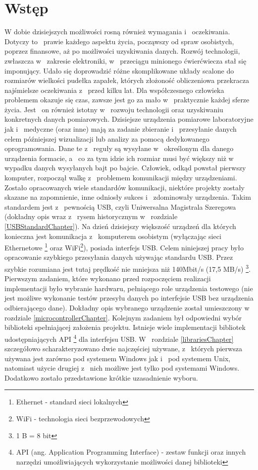 \documentclass{BscUS}
\begin{document}
\chapter{Wstęp}
\label{beginChapter}
\pagestyle{fancy}
W dobie dzisiejszych możliwości rosną również wymagania i~ oczekiwania. Dotyczy to~ prawie każdego aspektu życia, począwszy od spraw osobistych, poprzez finansowe, aż po możliwości uzyskiwania danych. Rozwój technologii, zwłaszcza w~ zakresie elektroniki, w~ przeciągu minionego ćwierćwiecza stał się imponujący. Udało się doprowadzić różne skomplikowane układy scalone do~ rozmiarów wielkości pudełka zapałek, których złożoność obliczeniowa przekracza najśmielsze oczekiwania z~ przed kilku lat. Dla współczesnego człowieka problemem okazuje się czas, zawsze jest go za mało w~ praktycznie każdej sferze życia. Jest~ on również istotny w~ rozwoju technologii oraz uzyskiwaniu konkretnych danych pomiarowych.
\newline
\indent Dzisiejsze urządzenia pomiarowe laboratoryjne jak i~ medyczne (oraz inne) mają za zadanie zbieranie i~ przesyłanie danych celem późniejszej wizualizacji lub analizy za pomocą dedykowanego oprogramowania. Dane te z~ reguły są wysyłane w~ określonym dla danego urządzenia formacie, a~ co za tym idzie ich rozmiar musi być większy niż w~ wypadku danych wysyłanych bajt po bajcie.
\newline
\indent Człowiek, odkąd powstał pierwszy komputer, rozpoczął walkę z~ problemem komunikacji między urządzeniami. Zostało opracowanych wiele standardów komunikacji, niektóre projekty zostały skazane na zapomnienie, inne odniosły sukces i~ zdominowały urządzenia. Takim standardem jest z~ pewnością USB, czyli Uniwersalna Magistrala Szeregowa (dokładny opis wraz z~ rysem historycznym w~ rozdziale \ref{USBStandardChapter}). Na dzień dzisiejszy większość urządzeń dla których konieczna jest komunikacja z~ komputerem osobistym (wyłączając sieci Ethernetowe \footnote{Ethernet - standard sieci lokalnych} oraz WiFi\footnote{WiFi - technologia sieci bezprzewodowych}), posiada interfejs USB.
\newline
\indent Celem niniejszej pracy było opracowanie szybkiego przesyłania danych używając standardu USB. Przez szybkie rozumiana jest tutaj prędkość nie mniejsza niż 140Mbit/s (17,5 MB/s) \footnote{1 B = 8 bit}.
\newline
\indent Pierwszym zadaniem, które wykonano przed rozpoczęciem realizacji implementacji było wybranie hardwaru, pełniącego role urządzenia testowego (nie jest możliwe wykonanie testów przesyłu danych po interfejsie USB bez urządzenia odbierającego dane). Dokładny opis wybranego urządzenie został umieszczony w~ rozdziale \ref{microcontrollerChapter}. Kolejnym zadaniem był odpowiedni wybór biblioteki spełniającej założenia projektu. Istnieje wiele implementacji bibliotek udostępniających API \footnote{API (ang. Application Programming Interface) - zestaw funkcji oraz innych narzędzi umożliwiających wykorzystanie możliwości danej biblioteki} dla interfejsu USB. W~ rozdziale \ref{librariesChapter} szczegółowo scharakteryzowano dwie najczęściej używane, z~ których pierwsza używana jest zarówno pod systemem Windows jak i~ pod systemem Unix, natomiast użycie drugiej z~ nich możliwe jest tylko pod systemami Windows. Dodatkowo zostało przedstawione krótkie uzasadnienie wyboru.
\end{document}
